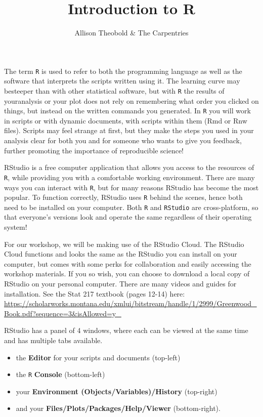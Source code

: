 \documentclass[]{article}
\title{Introduction to R}
\author{Allison Theobold \& The Carpentries}
\date{}
\providecommand{\tightlist}{%
  \setlength{\itemsep}{0pt}\setlength{\parskip}{0pt}}
\begin{document}
\maketitle

The term \texttt{R} is used to refer to both the programming language as
well as the software that interprets the scripts written using it. The
learning curve may besteeper than with other statistical software, but
with \texttt{R} the results of youranalysis or your plot does not rely
on remembering what order you clicked on things, but instead on the
written commands you generated. In \texttt{R} you will work in scripts
or with dynamic documents, with scripts within them (Rmd or Rnw files).
Scripts may feel strange at first, but they make the steps you used in
your analysis clear for both you and for someone who wants to give you
feedback, further promoting the importance of reproducible science!

RStudio is a free computer application that allows you access to the
resources of \texttt{R}, while providing you with a comfortable working
environment. There are many ways you can interact with \texttt{R}, but
for many reasons RStudio has become the most popular. To function
correctly, RStudio uses \texttt{R} behind the scenes, hence both need to
be installed on your computer. Both \texttt{R} and \texttt{RStudio} are
cross-platform, so that everyone's versions look and operate the same
regardless of their operating system!

For our workshop, we will be making use of the RStudio Cloud. The
RStudio Cloud functions and looks the same as the RStudio you can
install on your computer, but comes with some perks for collaboration
and easily accessing the workshop materials. If you so wish, you can
choose to download a local copy of RStudio on your personal computer.
There are many videos and guides for installation. See the Stat 217
textbook (pages 12-14) here:
\url{https://scholarworks.montana.edu/xmlui/bitstream/handle/1/2999/Greenwood_Book.pdf?sequence=3\&isAllowed=y_}

RStudio has a panel of 4 windows, where each can be viewed at the same
time and has multiple tabs available.

\begin{itemize}
\tightlist
\item
  the \textbf{Editor} for your scripts and documents (top-left)\\
\item
  the \texttt{R} \textbf{Console} (bottom-left)\\
\item
  your \textbf{Environment (Objects/Variables)/History} (top-right)\\
\item
  and your \textbf{Files/Plots/Packages/Help/Viewer} (bottom-right).
\end{itemize}
\end{document}
